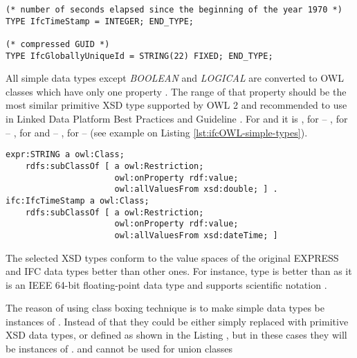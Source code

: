 \begin{lstlisting}[caption={Two defined data types considered as simple data types},label=ifcOWL-additional-simple-types]
(* number of seconds elapsed since the beginning of the year 1970 *)
TYPE IfcTimeStamp = INTEGER; END_TYPE;

(* compressed GUID *)
TYPE IfcGloballyUniqueId = STRING(22) FIXED; END_TYPE;
\end{lstlisting}

\begin{ontologyRule}
All simple data types except \emph{BOOLEAN} and \emph{LOGICAL} are converted to OWL classes which have only one property . The range of that property should be the most similar primitive XSD type supported by OWL 2 \cite{w3c:owl2-profiles} and recommended to use in Linked Data Platform Best Practices and Guideline \cite{w3c:ldp-best-practices}. For  and  it is , for  -- , for  -- , for  and  -- , for  --  (see example on Listing \ref{lst:ifcOWL-simple-types}).
\end{ontologyRule}

\begin{lstlisting}[caption={Simple data types as instances of \name{owl:Class}}, label=lst:ifcOWL-simple-types]
expr:STRING a owl:Class;
    rdfs:subClassOf [ a owl:Restriction;
                      owl:onProperty rdf:value;
                      owl:allValuesFrom xsd:double; ] .
ifc:IfcTimeStamp a owl:Class;
    rdfs:subClassOf [ a owl:Restriction;
                      owl:onProperty rdf:value;
                      owl:allValuesFrom xsd:dateTime; ]
\end{lstlisting}

The selected XSD types conform to the value spaces of the original EXPRESS and IFC data types better than other ones. For instance, type  is better than  as it is an IEEE 64-bit floating-point data type and supports scientific notation \cite{w3c:xsd,datapic:xsd}.

The reason of using class boxing technique is to make simple data types be instances of . Instead of that they could be either simply replaced with primitive XSD data types, or defined as shown in the Listing , but in these cases they will be instances of .  and cannot be used for union classes 


